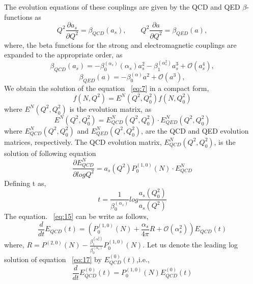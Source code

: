 \documentclass[review]{elsarticle}
\begin{document}
The evolution equations of  these couplings are given by the QCD
and QED $\beta$-functions as
\[
Q^{2}\frac{\partial a_{s}}{\partial Q^{2}}=\beta_{QCD}(a_{s}),\qquad Q^{2}\frac{\partial a}{\partial Q^{2}}=\beta_{QED}(a),
\]
where, the beta functions for the strong and electromagnetic couplings
are expanded to the appropriate order, as
\begin{equation}
\beta_{QCD}(a_{s})=-\beta_{0}^{(\alpha_s)}{(\alpha_s)}a_{s}^{2}-\beta_{1}^{(\alpha_s^2)}a_{s}^{3}+\mathcal{O}(a_{s}^{4}),\label{eq:11}
\end{equation}
\begin{equation}
\beta_{QED}(a)=-\beta_{0}^{(\alpha)}a^{2}+\mathcal{O}(a^{3}),\label{eq:12}
\end{equation}
We obtain the solution of the equation ~\eqref{eq:7}
in a compact form,
\begin{equation}
f(N,Q^{2})=E^{N}(Q^{2},Q_{0}^{2})f(N,Q_{0}^{2})\label{eq:13}
\end{equation}
where $E^{N}(Q^{2},Q_{0}^{2})$ is the evolution matrix, as
\begin{equation}
E^{N}(Q^{2},Q_{0}^{2})=E_{QCD}^{N}(Q^{2},Q_{0}^{2})\cdot E_{QED}^{N}(Q^{2},Q_{0}^{2})\label{eq:14}
\end{equation}
where $E_{QCD}^{N}(Q^{2},Q_{0}^{2})$ and $E_{QED}^{N}(Q^{2},Q_{0}^{2})$,
are the QCD and QED evolution matrices, respectively. 
The QCD evolution matrix, $E_{QCD}^{N}(Q^{2},Q_{0}^{2})$, is the
solution of following equation
\begin{equation}
\frac{\partial E_{QCD}^{N}}{\partial logQ^{2}}=a_{s}(Q^{2})P_{0}^{(1,0)}(N)\cdot E_{QCD}^{N}\label{eq:15}
\end{equation}
Defining t as,
\begin{equation}
t=\frac{1}{\beta_{0}^{(\alpha_s)}} log\frac{a_{s}(Q_{0}^{2})}{a_{s}(Q^{2})}\label{eq:16}
\end{equation}
The equation. ~\eqref{eq:15} can be write
as follows,
\begin{equation}
\frac{d}{dt}E_{QCD}(t)=(P_{0}^{(1,0)}(N)+\frac{\alpha_{s}}{4\pi}R+\mathcal{O}(\alpha_{s}^{2}))E_{QCD}(t)\label{eq:17}
\end{equation}
where, $R=P^{(2,0)}(N)-\frac{\beta_{1}^{(\alpha_s^2)}}{\beta_{0}^{(\alpha_s)}}P_{0}^{(1,0)}(N)$.
Let us denote the leading log solution of equation ~\eqref{eq:17}
by $E_{QCD}^{(0)}(t)$,i.e.,
\begin{equation}
\frac{d}{dt}E_{QCD}^{(0)}(t)=P_{0}^{(1,0)}(N)E_{QCD}^{(0)}(t)\label{eq:18}
\end{equation}
\end{document}
